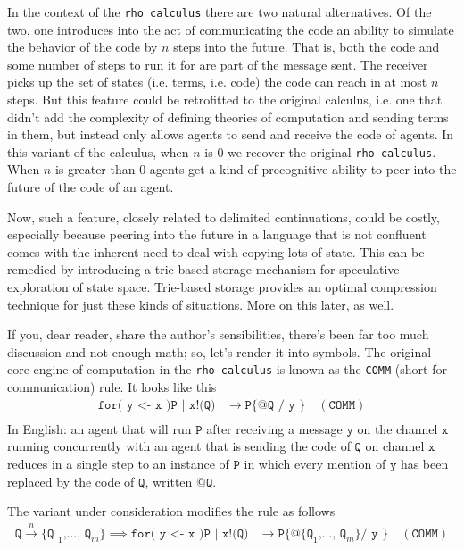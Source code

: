 \documentclass{article}
\newcommand{\code}[1]{\texttt{#1}}
\newcommand{\tcode}[1]{\texttt{#1}}
\begin{document}
\medskip

In the context of the \code{rho calculus} there are two natural alternatives. Of the two, one introduces into the act of communicating the code an ability to simulate the behavior of the code by $n$ steps into the future. That is, both the code and some number of steps to run it for are part of the message sent. The receiver picks up the set of states (i.e. terms, i.e. code) the code can reach in at most $n$ steps. But this feature could be retrofitted to the original calculus, i.e. one that didn't add the complexity of defining theories of computation and sending terms in them, but instead only allows agents to send and receive the code of agents. In this variant of the calculus, when $n$ is 0 we recover the original \code{rho calculus}. When $n$ is greater than 0 agents get a kind of precognitive ability to peer into the future of the code of an agent.

\medskip

Now, such a feature, closely related to delimited continuations, could be costly, especially because peering into the future in a language that is not confluent comes with the inherent need to deal with copying lots of state. This can be remedied by introducing a trie-based storage mechanism for speculative exploration of state space. Trie-based storage provides an optimal compression technique for just these kinds of situations. More on this later, as well.

\medskip

If you, dear reader, share the author's sensibilities, there's been far too much discussion and not enough math; so, let's render it into symbols. The original core engine of computation in the \code{rho calculus} is known as the \code{COMM} (short for communication) rule. It looks like this
\begin{align*}
  \code{for( y <- x )P | x!(Q)} &\rightarrow \code{P\{ @Q / y \}} \quad (\tcode{COMM}) \\
\end{align*}
In English: an agent that will run $\code{P}$ after receiving a message $\code{y}$ on the channel $\code{x}$ running concurrently with an agent that is sending the code of $\code{Q}$ on channel $\code{x}$ reduces in a single step to an instance of $\code{P}$ in which every mention of $\code{y}$ has been replaced by the code of $\code{Q}$, written $\code{@Q}$.

\medskip

The variant under consideration modifies the rule as follows
\begin{align*}
  \code{Q} \xrightarrow{n} \code{\{ Q }_1 \code{,} \ldots \code{, Q}_m \code{\}} \implies \code{for( y <- x )P | x!(Q)} &\rightarrow \code{P\{ @\{ Q}_1 \code{,} \ldots \code{, Q}_m \code{\} / y \}} \quad (\tcode{COMM}) \\
\end{align*}
\end{document}
